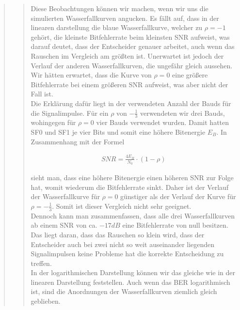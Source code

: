 \begin{quote}
\begin{quote}
                \vspace{2em}
    
    Diese Beobachtungen können wir machen, wenn wir uns die simulierten
    Wasserfallkurven angucken. Es fällt auf, dass in der linearen
    darstellung die blaue Wasserfallkurve, welcher zu $\rho = -1$ gehört, die
    kleinste Bitfehlerrate beim kleinsten SNR aufweist, was darauf deutet, dass
    der Entscheider genauer arbeitet, auch wenn das Rauschen im Vergleich am
    größten ist. Unerwartet ist jedoch der Verlauf der anderen Wasserfallkurven,
    die ungefähr gleich aussehen. Wir hätten erwartet, dass die Kurve von $\rho
    = 0$ eine größere Bitfehlerrate bei einem größeren SNR aufweist, was aber
    nicht der Fall ist.\\
    
    Die Erklärung dafür liegt in der verwendeten Anzahl der Bauds für die
    Signalimpulse. Für ein $\rho$ von $-\frac{1}{3}$ verwendeten wir drei
    Bauds, wohingegen für $\rho = 0$ vier Bauds verwendet wurden. Damit hatten
    SF0 und SF1 je vier Bits und somit eine höhere Bitenergie $E_B$. In
    Zusammenhang mit der Formel
    
    \begin{equation*}
        \begin{split}
            SNR = \frac{4 E_B}{N_0}\cdot (1-\rho)
        \end{split}
    \end{equation*}
    
    sieht man, dass eine höhere Bitenergie einen höheren SNR zur Folge hat,
    womit wiederum die Bitfehlerrate sinkt. Daher ist der Verlauf der
    Wasserfallkurve für $\rho = 0$ günstiger als der Verlauf der Kurve für
    $\rho = -\frac{1}{3}$. Somit ist dieser Vergleich nicht sehr geeignet.\\
    
    Dennoch kann man zusammenfassen, dass alle drei Wasserfallkurven ab einem
    SNR von ca. $-17 dB$ eine Bitfehlerrate von null besitzen. Das liegt daran,
    dass das Rauschen so klein wird, dass der Entscheider auch bei zwei nicht so
    weit auseinander liegenden Signalimpulsen keine Probleme hat die korrekte
    Entscheidung zu treffen.\\
    
    In der logarithmischen Darstellung können wir das gleiche wie in der
    linearen Darstellung feststellen. Auch wenn das BER logarithmisch ist, sind
    die Anordnungen der Wasserfallkurven ziemlich gleich geblieben.
                

\end{quote}
\end{quote}

